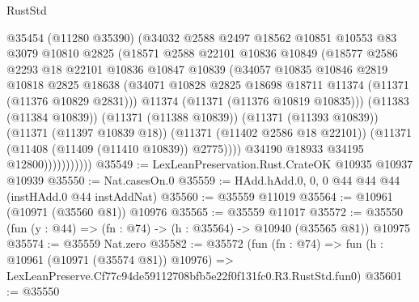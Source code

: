 \begin{lexlean}{RustStd}
\begin{coremodule}
                        @35454
                        (@11280 @35390)
                        (@34032
                          @2588
                          @2497
                          @18562
                          @10851
                          @10553
                          @83
                          @3079
                          @10810
                          @2825
                          (@18571
                            @2588
                            @22101
                            @10836
                            @10849
                            (@18577
                              @2586
                              @2293
                              @18
                              @22101
                              @10836
                              @10847
                              @10839
                              (@34057
                                @10835
                                @10846
                                @2819
                                @10818
                                @2825
                                @18638
                                (@34071
                                  @10828
                                  @2825
                                  @18698
                                  @18711
                                  @11374
                                  (@11371 (@11376 @10829 @2831)))
                                @11374
                                (@11371 (@11376 @10819 @10835)))
                              (@11383 (@11384 @10839))
                              (@11371 (@11388 @10839))
                              (@11371 (@11393 @10839))
                              (@11371 (@11397 @10839 @18))
                              (@11371 (@11402 @2586 @18 @22101))
                              (@11371 (@11408 (@11409 (@11410 @10839)) @2775))))
                          @34190
                          @18933
                          @34195
                          @12800)))))))))))
@35549 := LexLeanPreservation.Rust.CrateOK @10935 @10937 @10939
@35550 := Nat.casesOn.{0}
@35559 := HAdd.hAdd.{0, 0, 0} @44 @44 @44 (instHAdd.{0} @44 instAddNat)
@35560 := @35559 @11019
@35564 := @10961 (@10971 (@35560 @81)) @10976
@35565 := @35559 @11017
@35572 := @35550 (fun (y : @44) => (fn : @74) -> (h : @35564) -> @10940 (@35565 @81)) @10975
@35574 := @35559 Nat.zero
@35582 := @35572
    (fun (fn : @74) =>
    fun (h : @10961 (@10971 (@35574 @81)) @10976) =>
    LexLeanPreserve.Cf77c94de59112708bfb5e22f0f131fc0.R3.RustStd.fun0)
@35601 := @35550

\end{coremodule}
\end{lexlean}
